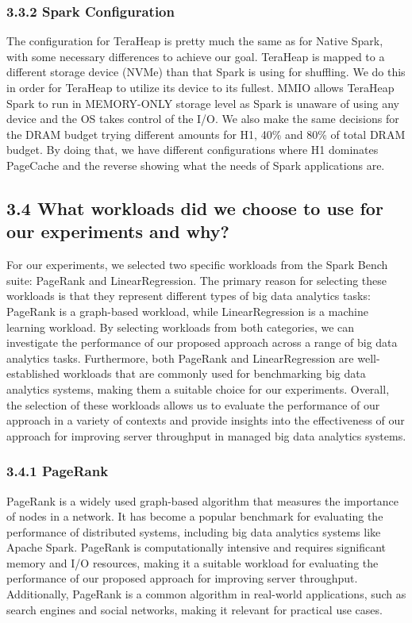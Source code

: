 \documentclass[twocolumn,10pt]{asme2e}
\begin{document}
\subsubsection*{3.3.2 Spark Configuration}
The configuration for TeraHeap is pretty much the same as for Native Spark, with some necessary differences to achieve our goal. TeraHeap is mapped to a different storage device (NVMe) than that Spark is using for shuffling. We do this in order for TeraHeap to utilize its device to its fullest. MMIO allows TeraHeap Spark to run in MEMORY-ONLY storage level as Spark is unaware of using any device and the OS takes control of the I/O. We also make the same decisions for the DRAM budget trying different amounts for H1, 40\% and 80\% of total DRAM budget. By doing that, we have different configurations where H1 dominates PageCache and the reverse showing what the needs of Spark applications are. 

\subsection*{3.4 What workloads did we choose to use for our experiments and why?}
For our experiments, we selected two specific workloads from the Spark Bench suite: PageRank and LinearRegression. The primary reason for selecting these workloads is that they represent different types of big data analytics tasks: PageRank is a graph-based workload, while LinearRegression is a machine learning workload. By selecting workloads from both categories, we can investigate the performance of our proposed approach across a range of big data analytics tasks. Furthermore, both PageRank and LinearRegression are well-established workloads that are commonly used for benchmarking big data analytics systems, making them a suitable choice for our experiments. Overall, the selection of these workloads allows us to evaluate the performance of our approach in a variety of contexts and provide insights into the effectiveness of our approach for improving server throughput in managed big data analytics systems.

\subsubsection*{3.4.1 PageRank}
PageRank is a widely used graph-based algorithm that measures the importance of nodes in a network. It has become a popular benchmark for evaluating the performance of distributed systems, including big data analytics systems like Apache Spark. PageRank is computationally intensive and requires significant memory and I/O resources, making it a suitable workload for evaluating the performance of our proposed approach for improving server throughput. Additionally, PageRank is a common algorithm in real-world applications, such as search engines and social networks, making it relevant for practical use cases.
\end{document}
